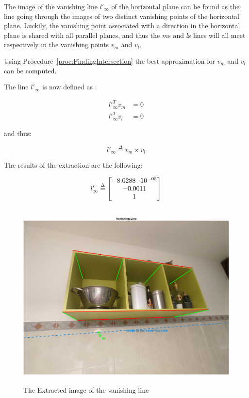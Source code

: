 The image of the vanishing line $l'_\infty$ of the horizontal plane can be found as the line going through the images of two distinct vanishing points of the horizontal plane. Luckily, the vanishing point associated with a direction in the horizontal plane is shared with all parallel planes, and thus the $m$s and $l$s lines will all meet respectively in the vanishing points $v_m$ and $v_l$. 

Using Procedure~\ref{proc:FindingIntersection} the best approximation for $v_m$ and $v_l$ can be computed.

The line $l'_\infty$ is now defined as :

\begin{equation*}
\begin{split}
l'_{\infty{}}^T v_m &= 0\\
l'_{\infty{}}^T v_l &= 0
\end{split}
\end{equation*}

and thus:

$$
l'_\infty{} \overset{\Delta}{=} v_m \times v_l
$$

The results of the extraction are the following:

$$
l'_\infty{} \overset{\Delta}{=}\colvec{-8.0288 \cdot 10^{-05}, -0.0011, 1}
$$

\begin{figure}[H]
\centering
\includegraphics[height=9.5cm, width=\textwidth, keepaspectratio]{Report/Images/2.1-VanishingLine/Vanishing Line.png}
\caption{\label{fig:Vanishing Line}The Extracted image of the vanishing line}
\end{figure}

